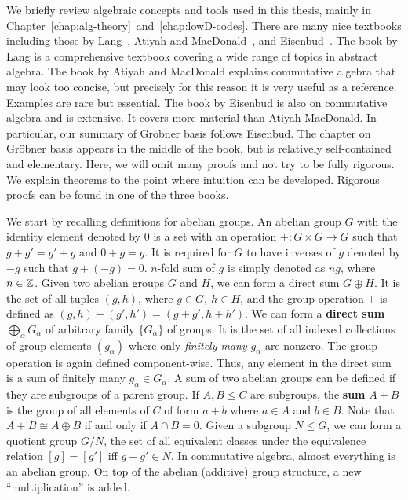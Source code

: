 

We briefly review algebraic concepts and tools used in this thesis, mainly in Chapter~\ref{chap:alg-theory}~and~\ref{chap:lowD-codes}.
There are many nice textbooks including those by Lang~\cite{Lang}, Atiyah and MacDonald~\cite{AtiyahMacDonald}, and Eisenbud~\cite{Eisenbud}.
The book by Lang is a comprehensive textbook covering a wide range of topics in abstract algebra.
The book by Atiyah and MacDonald explains commutative algebra that may look too concise, but precisely for this reason it is very useful as a reference.
Examples are rare but essential.
The book by Eisenbud is also on commutative algebra and is extensive.
It covers more material than Atiyah-MacDonald.
In particular, our summary of Gr\"obner basis follows Eisenbud.
The chapter on Gr\"obner basis appears in the middle of the book,
but is relatively self-contained and elementary.
Here, we will omit many proofs and not try to be fully rigorous.
We explain theorems to the point where intuition can be developed.
Rigorous proofs can be found in one of the three books.



We start by recalling definitions for abelian groups.
An abelian group $G$ with the identity element denoted by $0$
is a set with an operation $+ : G \times G \to G$ such that
$g + g' = g' + g$ and $0 + g = g$.
It is required for $G$ to have inverses of $g$ denoted by $-g$ such that $g + (-g) = 0$.
$n$-fold sum of $g$ is simply denoted as $ng$, where $n \in \mathbb{Z}$.
Given two abelian groups $G$ and $H$, we can form a direct sum $G \oplus H$.
It is the set of all tuples $(g,h)$, where $ g \in G,~ h \in H$,
and the group operation $+$ is defined as $(g,h) + (g',h') = (g+g',h+h')$.
We can form a {\bf direct sum} $\bigoplus_\alpha G_\alpha$ of arbitrary family $\{ G_\alpha \}$ of groups.
It is the set of all indexed collections of group elements $(g_\alpha)$ 
where only {\em finitely many} $g_\alpha$ are nonzero.
The group operation is again defined component-wise.
Thus, any element in the direct sum is a sum of finitely many $g_\alpha \in G_\alpha$.
A sum of two abelian groups can be defined if they are subgroups of a parent group.
If $A,B \le C$ are subgroups, the {\bf sum} $A + B$ is the group of all elements of $C$ of form $a+b$ where $a \in A$ and $b \in B$.
Note that $A+B \cong A \oplus B$ if and only if $A \cap B = 0$.
Given a subgroup $N \le G$, we can form a quotient group $G/N$,
the set of all equivalent classes under the equivalence relation $[g]=[g']$ iff $g-g' \in N$.
In commutative algebra, almost everything is an abelian group.
On top of the abelian (additive) group structure, a new ``multiplication'' is added.


